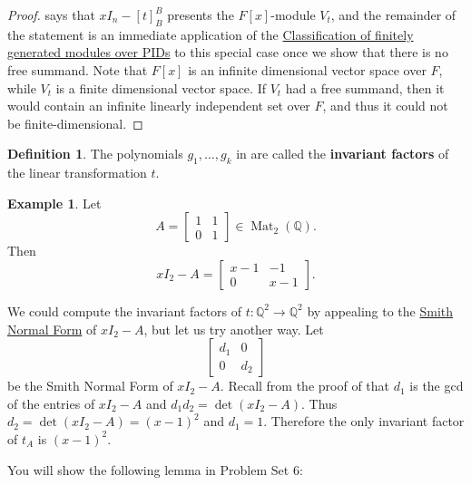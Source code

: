 \documentclass[12pt]{report}
\numberwithin{equation}{section}
\numberwithin{theorem}{chapter}
\theoremstyle{definition}
\newtheorem{definition}[theorem]{Definition}
\newtheorem{example}[theorem]{Example}
\newtheorem*{basic properties}{Basic Properties}
\newtheorem*{Important Remark}{Important Remark}
\newcommand{\df}[1]{{\bf #1}\index{#1}}
\DeclareMathOperator{\M}{Mat}
\begin{document}
\begin{proof}
 says that $xI_n-[t]_B^B$ presents the $F[x]$-module $V_t$, and the remainder of the statement is an immediate application of the \hyperref[classification elementary divisors]{Classification of finitely generated modules over PIDs} to this special case once we show that there is no free summand. Note that $F[x]$ is an infinite dimensional vector space over $F$, while $V_t$ is a finite dimensional vector space. If $V_t$ had a free summand, then it would contain an infinite linearly independent set over $F$, and thus it could not be finite-dimensional.
\end{proof}


\begin{definition}
The polynomials $g_1,\ldots,g_k$ in  are called the \df{invariant factors} of the linear transformation $t$.
\end{definition}


\begin{example}\label{ex:SNF}
Let 
$$A= \begin{bmatrix} 1 & 1 \\ 0 & 1  \end{bmatrix}\in \M_2(\mathbb{Q}).$$ 
Then 
$$xI_2-A= \begin{bmatrix} x-1 & -1 \\ 0 & x-1  \end{bmatrix}.$$

We could compute the invariant factors of $t\!:\mathbb{Q}^2\to\mathbb{Q}^2$ by appealing to the \hyperref[Smith Normal Form]{Smith Normal Form} of $xI_2-A$, but let us try another way. Let
$$\begin{bmatrix} d_1 & 0 \\ 0 & d_2 \end{bmatrix}$$
be the Smith Normal Form of $xI_2-A$. Recall from the proof of  that $d_1$ is the gcd of the entries of $xI_2-A$ and $d_1d_2=\det(xI_2-A)$. Thus $d_2=\det(xI_2-A)=(x-1)^2$ and $d_1=1$. Therefore the only invariant factor of $t_A$ is $(x-1)^2$.
\end{example}



You will show the following lemma in Problem Set 6:
\end{document}
